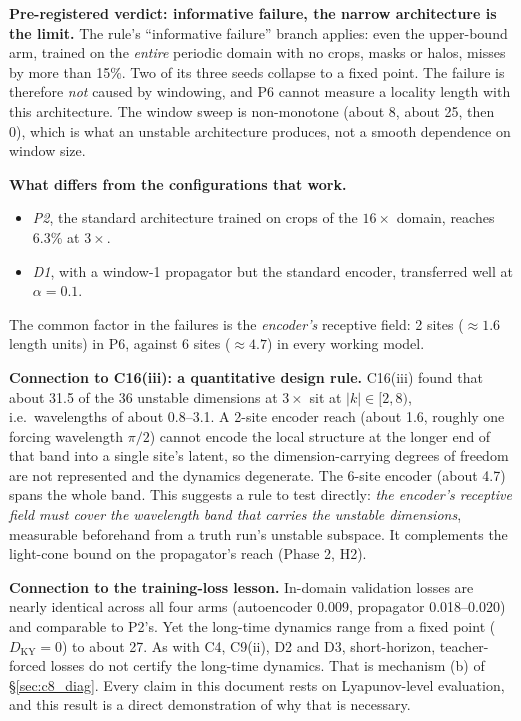 \documentclass[11pt]{article}
\begin{document}
\textbf{Pre-registered verdict: informative failure, the narrow
architecture is the limit.} The rule's ``informative failure'' branch
applies: even the upper-bound arm, trained on the \emph{entire} periodic
domain with no crops, masks or halos, misses by more than 15\%. Two of its
three seeds collapse to a fixed point. The failure is therefore
\emph{not} caused by windowing, and P6 cannot measure a locality length
with this architecture. The window sweep is non-monotone (about 8, about
25, then 0), which is what an unstable architecture produces, not a
smooth dependence on window size.

\textbf{What differs from the configurations that work.}
\begin{itemize}[leftmargin=*]
\item \emph{P2}, the standard architecture trained on crops of the
  $16\times$ domain, reaches 6.3\% at $3\times$.
\item \emph{D1}, with a window-1 propagator but the standard encoder,
  transferred well at $\alpha{=}0.1$.
\end{itemize}
The common factor in the failures is the \emph{encoder's} receptive
field: 2 sites ($\approx1.6$ length units) in P6, against 6 sites
($\approx4.7$) in every working model.

\textbf{Connection to C16(iii): a quantitative design rule.} C16(iii)
found that about 31.5 of the 36 unstable dimensions at $3\times$ sit at
$|k|\in[2,8)$, i.e.\ wavelengths of about 0.8--3.1. A 2-site encoder
reach (about 1.6, roughly one forcing wavelength $\pi/2$) cannot encode
the local structure at the longer end of that band into a single site's
latent, so the dimension-carrying degrees of freedom are not represented
and the dynamics degenerate. The 6-site encoder (about 4.7) spans the
whole band. This suggests a rule to test directly: \emph{the encoder's
receptive field must cover the wavelength band that carries the unstable
dimensions}, measurable beforehand from a truth run's unstable
subspace. It complements the light-cone bound on the propagator's reach
(Phase 2, H2).

\textbf{Connection to the training-loss lesson.} In-domain validation
losses are nearly identical across all four arms (autoencoder 0.009,
propagator 0.018--0.020) and comparable to P2's. Yet the long-time
dynamics range from a fixed point ($D_{\mathrm{KY}}{=}0$) to about 27. As
with C4, C9(ii), D2 and D3, short-horizon, teacher-forced losses do not
certify the long-time dynamics. That is mechanism (b) of
\S\ref{sec:c8_diag}. Every claim in this document rests on Lyapunov-level
evaluation, and this result is a direct demonstration of why that is
necessary.
\end{document}
